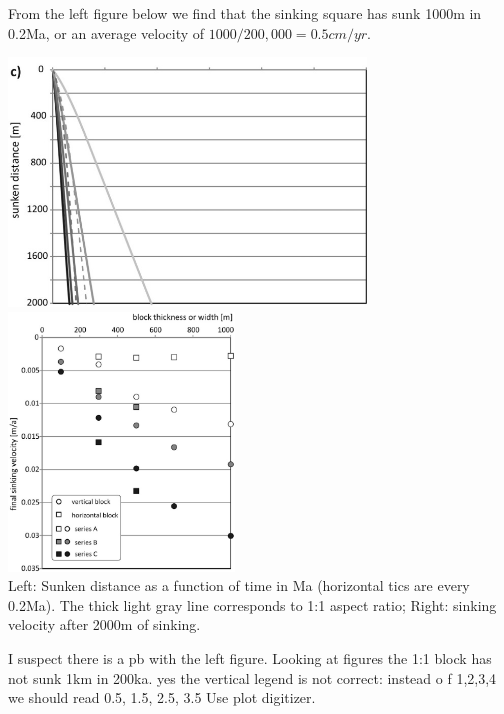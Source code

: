 


From the left figure below we find that the sinking square has sunk 1000m in 0.2Ma, or an average 
velocity of $1000/200,000=0.5cm/yr$. 
\begin{center}
\includegraphics[width=9.5cm]{python_codes/fieldstone_67/images/buks12d}
\includegraphics[width=6cm]{python_codes/fieldstone_67/images/buks12e}\\
{\captionfont Left: Sunken distance as a function of time in Ma (horizontal 
tics are every 0.2Ma). The thick light gray line corresponds to 1:1 aspect ratio; 
Right: sinking velocity after 2000m of sinking.}
\end{center}

{\color{red} I suspect there is a pb with the left figure. Looking at figures
the 1:1 block has not sunk 1km in 200ka. yes the vertical legend is not correct: 
instead o f 1,2,3,4 we should read 0.5, 1.5, 2.5, 3.5}
Use plot digitizer.




